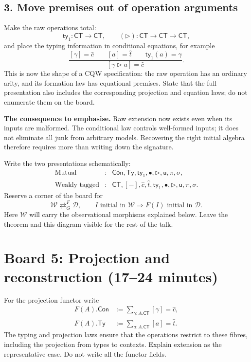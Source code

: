 \documentclass[11pt]{article}
\newcommand{\Con}{\mathsf{Con}}
\newcommand{\Ty}{\mathsf{Ty}}
\newcommand{\CT}{\mathsf{CT}}
\newcommand{\Weak}{\mathcal{W}}
\newcommand{\Mutual}{\mathcal{D}}
\newcommand{\ext}{\mathbin{\triangleright}}
\newcommand{\ctag}{\widehat c}
\newcommand{\ttag}{\widehat t}
\newcommand{\tyone}{\mathsf{ty}_1}
\begin{document}
\subsection*{3. Move premises out of operation arguments}

Make the raw operations total:
\[
 \tyone:\CT\to\CT,\qquad
 ({\ext}):\CT\to\CT\to\CT,
\]
and place the typing information in conditional equations, for example
\[
 \frac{[\gamma]=\ctag\qquad [a]=\ttag\qquad
        \tyone(a)=\gamma}
      {[\gamma\ext a]=\ctag}.
\]
This is now the shape of a CQW specification: the raw operation has an
ordinary arity, and its formation law has equational premises.
State that the full presentation also includes the corresponding projection
and equation laws; do not enumerate them on the board.

\textbf{The consequence to emphasise.} Raw extension now exists even when
its inputs are malformed. The conditional law controls well-formed inputs;
it does not eliminate all junk from arbitrary models. Recovering the right
initial algebra therefore requires more than writing down the signature.

Write the two presentations schematically:
\[
\begin{array}{rcl}
 \text{Mutual} &:& \Con,\Ty,\tyone,\bullet,{\ext},\mathsf u,\pi,\sigma,\\
 \text{Weakly tagged} &:& \CT,[-],\ctag,\ttag,
                         \tyone,\bullet,{\ext},\mathsf u,\pi,\sigma.
\end{array}
\]
Reserve a corner of the board for
\[
 \Weak\mathrel{\mathop{\rightleftarrows}^{F}_{G}}\Mutual,
 \qquad
 I\text{ initial in }\Weak
 \Longrightarrow F(I)\text{ initial in }\Mutual.
\]
Here \(\Weak\) will carry the observational morphisms explained below.
Leave the theorem and this diagram visible for the rest of the talk.

\section*{Board 5: Projection and reconstruction (17--24 minutes)}

For the projection functor write
\[
\begin{aligned}
 F(A).\Con&:=\sum_{\gamma:A.\CT}[\gamma]=\ctag,\\
 F(A).\Ty&:=\sum_{a:A.\CT}[a]=\ttag.
\end{aligned}
\]
The typing and projection laws ensure that the operations restrict to these
fibres, including the projection from types to contexts. Explain extension
as the representative case. Do not write all the functor fields.
\end{document}
